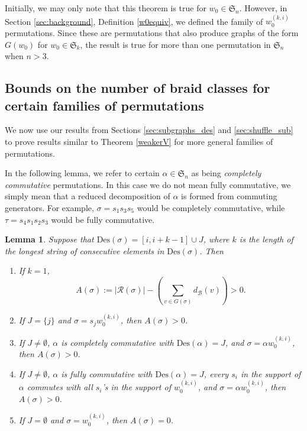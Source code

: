 \documentclass[11pt,reqno]{amsart}
\newtheorem{lemma}[theorem]{Lemma}
\theoremstyle{definition}
\theoremstyle{notation}
\newcommand{\Des}{\text{Des}}
\newcommand{\calR}{\mathcal{R}}
\newcommand{\calB}{\mathcal{B}}
\newcommand{\Sym}{\mathfrak{S}}
\begin{document}
Initially, we may only note that this theorem is true for $w_0\in \mathfrak{S}_n$. However, in Section \ref{sec:background}, Definition \ref{w0equiv}, we defined the family of $w_0^{(k,i)}$ permutations. Since these are permutations that also produce graphs of the form $G(w_0)$ for $w_0\in \mathfrak{S}_k$, the result is true for more than one permutation in $\mathfrak{S}_n$ when $n>3$.





\subsection{Bounds on the number of braid classes for certain families of permutations}%

We now use our results from Sections \ref{sec:subgraphs_des} and \ref{sec:shuffle_sub} to prove results similar to Theorem \ref{weakerV} for more general families of permutations.

In the following lemma, we refer to certain $\alpha\in \Sym_n$ as being \textit{completely commutative} permutations. In this case we do not mean fully commutative, we simply mean that a reduced decomposition of $\alpha$ is formed from commuting generators. For example, $\sigma = s_1s_3s_5$ would be completely commutative, while $\tau = s_4 s_1s_2s_3$ would be fully commutative.

\begin{lemma}\label{casesproved}
Suppose that $\Des(\sigma) =  [i,i+k-1]\cup J$, where $k$ is the length of the longest string of consecutive elements in $\Des(\sigma)$. Then 
\begin{enumerate}
\item If $k=1$,
\[
A(\sigma) := |\calR(\sigma)|-\left (\sum_{v\in G(\sigma)}d_\calB(v) \right )>0.
\]
\item If $J=\{ j\}$ and $\sigma =s_j w_0^{(k,i)}$, then $A(\sigma)>0$.
\item If $J \neq \emptyset$, $\alpha$ is completely commutative with $\Des(\alpha) = J$, and $\sigma = \alpha w_0^{(k,i)}$, then $A(\sigma)>0$.
\item If $J \neq \emptyset$, $\alpha$ is fully commutative with $\Des(\alpha) = J$,  every $s_i$ in the support of $\alpha$ commutes with all $s_i$'s in the support of $w_0^{(k,i)}$, and $\sigma = \alpha w_0^{(k,i)}$, then $A(\sigma)>0$.
\item If $J=\emptyset$ and $\sigma = w_0^{(k,i)}$, then $A(\sigma)=0$.
\end{enumerate}
\end{lemma}
\end{document}
